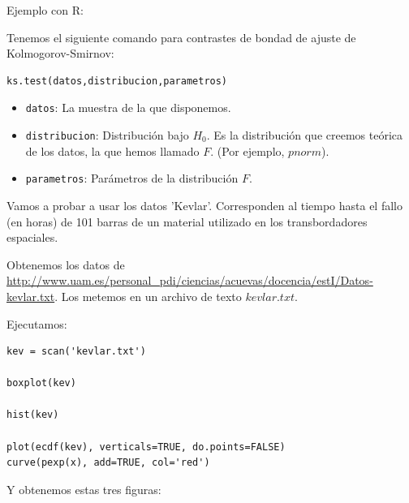 \documentclass[nochap]{apuntes}
\begin{document}
\begin{example}
Ejemplo con R:

Tenemos el siguiente comando para contrastes de bondad de ajuste de Kolmogorov-Smirnov:
\begin{verbatim}
ks.test(datos,distribucion,parametros)
\end{verbatim}

\begin{itemize}
\item \verb|datos|: La muestra de la que disponemos.
\item \verb|distribucion|: Distribución bajo $H_0$. Es la distribución que creemos teórica de los datos, la que hemos llamado $F$. (Por ejemplo, $pnorm$).
\item \verb|parametros|: Parámetros de la distribución $F$. 
\end{itemize}
Vamos a probar a usar los datos 'Kevlar'. Corresponden al tiempo hasta el fallo (en horas) de 101 barras de un material utilizado en los transbordadores espaciales.

Obtenemos los datos de \url{http://www.uam.es/personal_pdi/ciencias/acuevas/docencia/estI/Datos-kevlar.txt}. Los metemos en un archivo de texto $kevlar.txt$.

Ejecutamos:

\begin{verbatim}
kev = scan('kevlar.txt')

boxplot(kev)

hist(kev)

plot(ecdf(kev), verticals=TRUE, do.points=FALSE)
curve(pexp(x), add=TRUE, col='red')
\end{verbatim}
 
Y obtenemos estas tres figuras:


\end{example}
\end{document}
